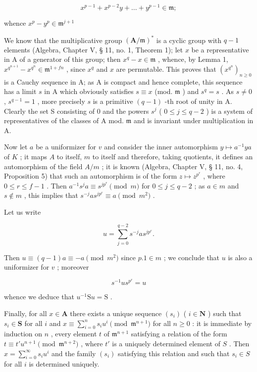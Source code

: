 \[
x ^ {p - 1} + x ^ {p - 2} y + \dots + y ^ {p - 1} \in \mathfrak {m};
\]

whence \(x^{p} - y^{p}\in \mathfrak{m}^{j + 1}\)

We know that the multiplicative group \((\mathbf{A} / \mathfrak{m})^*\) is a cyclic group with \(q - 1\) elements (Algebra, Chapter V, § 11, no. 1, Theorem 1); let \(x\) be a representative in A of a generator of this group; then \(x^{q} - x \in \mathfrak{m}\) , whence, by Lemma 1, \(x^{q^{n + 1}} - x^{q^n} \in \mathfrak{m}^{1 + fn}\) , since \(x^{q}\) and \(x\) are permutable. This proves that \((x^{q^n})_{n \geqslant 0}\) is a Cauchy sequence in A; as A is compact and hence complete, this sequence has a limit \(s\) in A which obviously satisfies \(s \equiv x\) (mod. \(\mathfrak{m}\) ) and \(s^q = s\) . As \(s \neq 0\) , \(s^{q - 1} = 1\) , more precisely \(s\) is a primitive \((q - 1)\) -th root of unity in A. Clearly the set S consisting of 0 and the powers \(s^j\) ( \(0 \leqslant j \leqslant q - 2\) ) is a system of representatives of the classes of A mod. \(\mathfrak{m}\) and is invariant under multiplication in A.

Now let \(a\) be a uniformizer for \(v\) and consider the inner automorphism \(y \mapsto a^{-1}ya\) of \(K\) ; it maps \(A\) to itself, \(m\) to itself and therefore, taking quotients, it defines an automorphism of the field \(A/m\) ; it is known (Algebra, Chapter V, § 11, no. 4, Proposition 5) that such an automorphism is of the form \(z \mapsto z^{p^r}\) , where \(0 \leqslant r \leqslant f - 1\) . Then \(a^{-1}s^j a \equiv s^{jp^r} \pmod{m}\) for \(0 \leqslant j \leqslant q - 2\) ; as \(a \in m\) and \(s \notin m\) , this implies that \(s^{-j}as^{jp^r} \equiv a \pmod{m^2}\) .

Let us write

\[
u = \sum_ {j = 0} ^ {q - 2} s ^ {- j} a s ^ {j p ^ {r}}.
\]

Then \(u \equiv (q - 1)a \equiv -a \pmod{m^2}\) since \(p.1 \in m\) ; we conclude that \(u\) is also a uniformizer for \(v\) ; moreover

\[
s ^ {- 1} u s ^ {p ^ {r}} = u\tag{3}
\]

whence we deduce that \(u^{-1} \mathrm{S}u = \mathrm{S}\) .

Finally, for all \(x \in \mathbf{A}\) there exists a unique sequence \((s_i)\) ( \(i \in \mathbf{N}\) ) such that \(s_i \in \mathbf{S}\) for all \(i\) and \(x \equiv \sum_{i=0}^{n} s_i u^i \pmod{\mathfrak{m}^{n+1}}\) for all \(n \geqslant 0\) : it is immediate by induction on \(n\) , every element \(t\) of \(\mathfrak{m}^{n+1}\) satisfying a relation of the form \(t \equiv t'u^{n+1} \pmod{\mathfrak{m}^{n+2}}\) , where \(t'\) is a uniquely determined element of \(S\) . Then \(x = \sum_{i=0}^{\infty} s_i u^i\) and the family \((s_i)\) satisfying this relation and such that \(s_i \in S\) for all \(i\) is determined uniquely.

